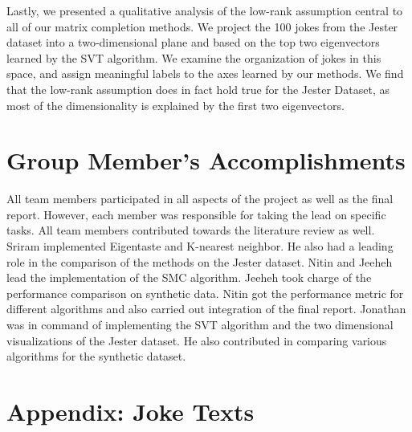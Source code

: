 \documentclass{article} %
\begin{document}
Lastly, we presented a qualitative analysis of the low-rank assumption
central to all of our matrix completion methods. We project the 100
jokes from the Jester dataset into a two-dimensional plane and based
on the top two eigenvectors learned by the SVT algorithm. We examine
the organization of jokes in this space, and assign meaningful labels
to the axes learned by our methods. We find that the low-rank
assumption does in fact hold true for the Jester Dataset, as most of
the dimensionality is explained by the first two eigenvectors.


\section{Group Member's Accomplishments}

All team members participated in all aspects of the project as well as
the final report. However, each member was responsible for taking the
lead on specific tasks. All team members contributed towards the
literature review as well. Sriram implemented Eigentaste and K-nearest
neighbor. He also had a leading role in the comparison of the methods
on the Jester dataset. Nitin and Jeeheh lead the implementation of the
SMC algorithm. Jeeheh took charge of the performance comparison on
synthetic data. Nitin got the performance metric for different
algorithms and also carried out integration of the final report.
Jonathan was in command of implementing the SVT algorithm and the two
dimensional visualizations of the Jester dataset. He also contributed
in comparing various algorithms for the synthetic dataset.





\newpage

\section{Appendix: Joke Texts}
\end{document}
